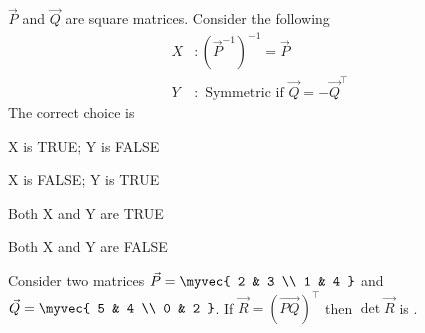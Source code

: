 \item $\vec{P}$ and $\vec{Q}$ are square matrices. Consider the following
\begin{align*}
	X&: (\vec{P}^{-1})^{-1} = \vec{P}\\
	Y&: \text{ Symmetric if }\vec{Q} = -\vec{Q}^{\top}
\end{align*}
The correct choice is
\hfill{}
\begin{enumerate}
\begin{multicols}{2}
\item X is TRUE; Y is FALSE
\item X is FALSE; Y is TRUE
\item Both X and Y are TRUE
\item Both X and Y are FALSE
\end{multicols}
\end{enumerate}
\item Consider two matrices $\vec{P} = \myvec{ 2 & 3 \\ 1 & 4 }$ and $\vec{Q} = \myvec{ 5 & 4 \\ 0 & 2 }$. If $\vec{R} = (\vec{PQ})^{\top}$ then $\det \vec{R}$ is \underline{\hspace{2cm}}. \hfill{}
